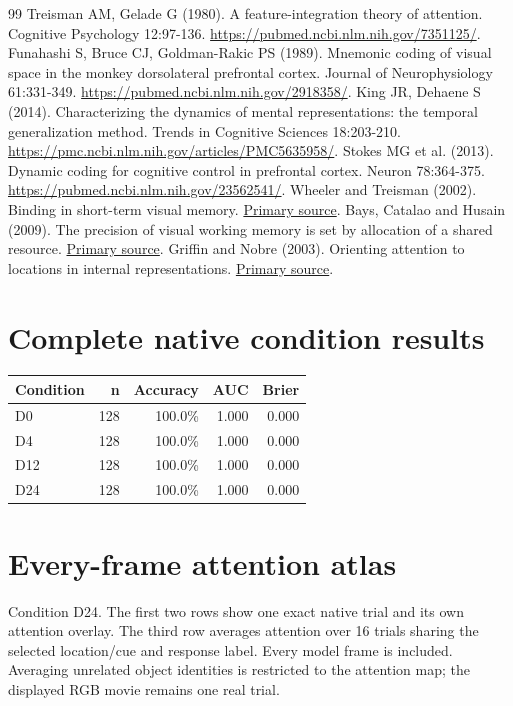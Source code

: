 \documentclass[11pt]{article}
\begin{document}
\begin{thebibliography}{99}
 Treisman AM, Gelade G (1980). A feature-integration theory of attention. Cognitive Psychology 12:97-136. \url{https://pubmed.ncbi.nlm.nih.gov/7351125/}.
 Funahashi S, Bruce CJ, Goldman-Rakic PS (1989). Mnemonic coding of visual space in the monkey dorsolateral prefrontal cortex. Journal of Neurophysiology 61:331-349. \url{https://pubmed.ncbi.nlm.nih.gov/2918358/}.
 King JR, Dehaene S (2014). Characterizing the dynamics of mental representations: the temporal generalization method. Trends in Cognitive Sciences 18:203-210. \url{https://pmc.ncbi.nlm.nih.gov/articles/PMC5635958/}.
 Stokes MG et al. (2013). Dynamic coding for cognitive control in prefrontal cortex. Neuron 78:364-375. \url{https://pubmed.ncbi.nlm.nih.gov/23562541/}.
 Wheeler and Treisman (2002). Binding in short-term visual memory. \href{https://pubmed.ncbi.nlm.nih.gov/11900102/}{Primary source}.
 Bays, Catalao and Husain (2009). The precision of visual working memory is set by allocation of a shared resource. \href{https://pubmed.ncbi.nlm.nih.gov/19810788/}{Primary source}.
 Griffin and Nobre (2003). Orienting attention to locations in internal representations. \href{https://pubmed.ncbi.nlm.nih.gov/14709235/}{Primary source}.
\end{thebibliography}\clearpage\appendix\section{Complete native condition results}
\small\begin{longtable}{p{}rrrr}\toprule Condition & n & Accuracy & AUC & Brier\\\midrule\endhead
D0 & 128 & 100.0\% & 1.000 & 0.000\\
D4 & 128 & 100.0\% & 1.000 & 0.000\\
D12 & 128 & 100.0\% & 1.000 & 0.000\\
D24 & 128 & 100.0\% & 1.000 & 0.000\\
\bottomrule\end{longtable}\normalsize\section{Every-frame attention atlas}
Condition D24. The first two rows show one exact native trial and its own attention overlay. The third row averages attention over 16 trials sharing the selected location/cue and response label. Every model frame is included. Averaging unrelated object identities is restricted to the attention map; the displayed RGB movie remains one real trial.
\end{document}
